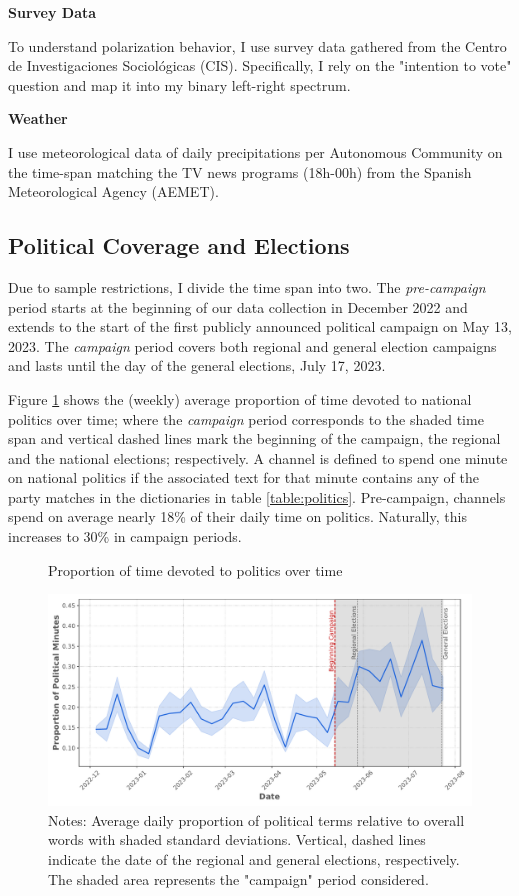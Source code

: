 \documentclass[12pt]{article}
\begin{document}
	\textbf{Survey Data}
	
	To understand polarization behavior, I use survey data gathered from the Centro de Investigaciones Sociológicas (CIS). Specifically, I rely on the "intention to vote" question and map it into my binary left-right spectrum. 
	
	\textbf{Weather}
	
	I use meteorological data of daily precipitations per Autonomous Community on the time-span matching the TV news programs (18h-00h) from the Spanish Meteorological Agency (AEMET).
	
	
	
	\subsection{Political Coverage and Elections}
	
	
	
	
	Due to sample restrictions, I divide the time span into two. The \textit{pre-campaign} period starts at the beginning of our data collection in December 2022 and extends to the start of the first publicly announced political campaign on May 13, 2023. The \textit{campaign} period covers both regional and general election campaigns and lasts until the day of the general elections, July 17, 2023.
	
	Figure \ref{fig:coverage} shows the (weekly) average proportion of time devoted to national politics over time; where the \textit{campaign} period corresponds to the shaded time span and vertical dashed lines mark the beginning of the campaign, the regional and the national elections; respectively.  A channel is defined to spend one minute on national politics if the associated text for that minute contains any of the party matches in the dictionaries in table \ref{table:politics}. Pre-campaign, channels spend on average nearly 18\% of their daily time on politics. Naturally, this increases to 30\% in campaign periods. 
	
	\begin{figure}[h!]
		\caption{Proportion of time devoted to politics over time}
		\centering
		\includegraphics[width=120mm]{figures/political_words2}
		\caption*{\small Notes: Average daily proportion of political terms relative to overall words with shaded standard deviations. Vertical, dashed lines indicate the date of the regional and general elections, respectively. The shaded area represents the "campaign" period considered.}
		\label{fig:coverage}
	\end{figure}
	
\end{document}
